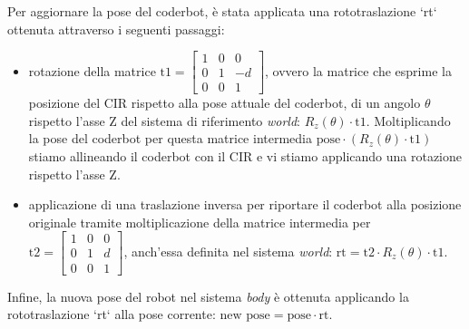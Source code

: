 \documentclass[11pt]{article}
\begin{document}
Per aggiornare la pose del coderbot, è stata applicata una rototraslazione `rt` ottenuta attraverso i seguenti passaggi:
\begin{itemize}
\item rotazione della matrice \(\text{t1}= \begin{bmatrix}1&0&0\\0&1&-d\\0&0&1\end{bmatrix}\), ovvero la matrice che esprime la posizione del CIR rispetto alla pose attuale del coderbot, di un angolo \(\theta\) rispetto l'asse Z del sistema di riferimento \emph{world}: \(R_z(\theta)\cdot\text{t1}\). Moltiplicando la pose del coderbot per questa matrice intermedia \(\text{pose}\cdot (R_z(\theta)\cdot\text{t1})\) stiamo allineando il coderbot con il CIR e vi stiamo applicando una rotazione rispetto l'asse Z.
\item applicazione di una traslazione inversa per riportare il coderbot alla posizione originale tramite moltiplicazione della matrice intermedia per \(\text{t2}= \begin{bmatrix}1&0&0\\0&1&d\\0&0&1\end{bmatrix}\), anch'essa definita nel sistema \emph{world}: \(\text{rt}=\text{t2}\cdot R_z(\theta)\cdot\text{t1}\).
\end{itemize}
Infine, la nuova pose del robot nel sistema \emph{body} è ottenuta applicando la rototraslazione `rt` alla pose corrente: \(\text{new pose} = \text{pose}\cdot\text{rt}\).
\end{document}
